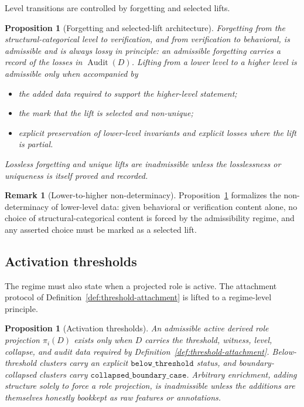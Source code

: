 \documentclass[11pt]{article}
\newtheorem{proposition}[theorem]{Proposition}
\theoremstyle{definition}
\newtheorem{remark}[theorem]{Remark}
\newcommand{\Audit}[1]{\ensuremath{\operatorname{Audit}\!\left(#1\right)}}
\newcommand{\belowthr}{\texttt{below\_threshold}}
\newcommand{\collapsedbc}{\texttt{collapsed\_boundary\_case}}
\begin{document}
Level transitions are controlled by forgetting and selected lifts.

\begin{proposition}[Forgetting and selected-lift architecture]\label{prop:forgetting-lifts}
Forgetting from the structural-categorical level to verification, and
from verification to behavioral, is admissible and is always lossy in
principle: an admissible forgetting carries a record of the losses in
\(\Audit{D}\). Lifting from a lower level to a higher level is
admissible only when accompanied by
\begin{itemize}[topsep=2pt,itemsep=1pt]
  \item the added data required to support the higher-level statement;
  \item the mark that the lift is selected and non-unique;
  \item explicit preservation of lower-level invariants and explicit
    losses where the lift is partial.
\end{itemize}
Lossless forgetting and unique lifts are inadmissible unless the losslessness
or uniqueness is itself proved and recorded.
\end{proposition}

\begin{remark}[Lower-to-higher non-determinacy]\label{rem:lower-to-higher-non-determinacy}
Proposition~\ref{prop:forgetting-lifts} formalizes the non-determinacy of
lower-level data: given behavioral or verification content alone, no
choice of structural-categorical content is forced by the admissibility
regime, and any asserted choice must be marked as a selected lift.
\end{remark}

\subsection{Activation thresholds}\label{subsec:activation-thresholds}

The regime must also state when a projected role is active. The
attachment protocol of Definition~\ref{def:threshold-attachment} is
lifted to a regime-level principle.

\begin{proposition}[Activation thresholds]\label{prop:activation-thresholds}
An admissible active derived role projection \(\pi_i(D)\) exists only when
\(D\) carries the threshold, witness, level, collapse, and audit data
required by Definition~\ref{def:threshold-attachment}. Below-threshold
clusters carry an explicit \(\belowthr\) status, and boundary-collapsed
clusters carry \(\collapsedbc\). Arbitrary enrichment, adding structure
solely to force a role projection, is inadmissible unless the additions
are themselves honestly bookkept as raw features or annotations.
\end{proposition}
\end{document}
